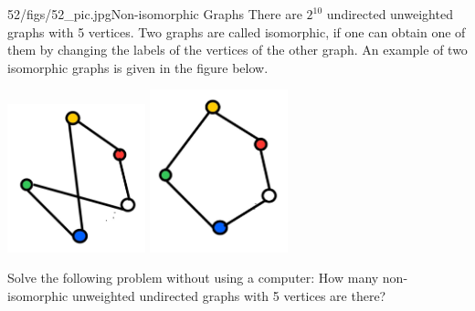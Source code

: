 \begin{problem}{52/figs/52_pic.jpg}{Non-isomorphic Graphs}  There are $2^{10}$ undirected unweighted graphs with 5 vertices. Two graphs are called isomorphic, if one can obtain one of them by changing the labels of the vertices of the other graph. An example of two isomorphic graphs is given in the figure below.

\begin{center}
	\includegraphics[width=4cm]{52/figs/52_p1.jpg}	\includegraphics[width=4cm]{52/figs/52_p2.jpg}
\end{center}	

Solve the following problem without using a computer: How many non-isomorphic unweighted undirected graphs with 5 vertices are there?
\end{problem}